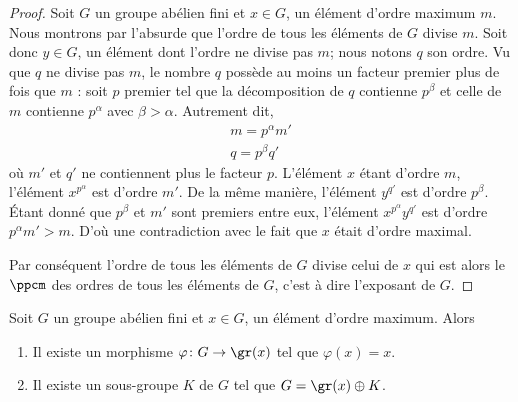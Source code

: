 \begin{proof}
    Soit \( G\) un groupe abélien fini et \( x\in G\), un élément d'ordre maximum \( m\). Nous montrons par l'absurde que l'ordre de tous les éléments de \( G\) divise \( m\). Soit donc \( y\in G\), un élément dont l'ordre ne divise pas \( m\); nous notons $q$ son ordre. Vu que \( q\) ne divise pas \( m\), le nombre \( q\) possède au moins un facteur premier plus de fois que \( m\) : soit \( p\) premier tel que la décomposition de \( q\) contienne \( p^{\beta}\) et celle de \( m\) contienne \( p^{\alpha}\) avec \( \beta>\alpha\). Autrement dit,
    \begin{subequations}
        \begin{align}
            m=p^{\alpha}m'\\
            q=p^{\beta}q'
        \end{align}
    \end{subequations}
    où \( m'\) et \( q'\) ne contiennent plus le facteur \( p\). L'élément \( x\) étant d'ordre \( m\), l'élément \( x^{p^{\alpha}}\) est d'ordre \( m'\). De la même manière, l'élément \( y^{q'}\) est d'ordre \( p^{\beta}\). Étant donné que \( p^{\beta}\) et \( m'\) sont premiers entre eux, l'élément  \( x^{p^{\alpha}}y^{q'}\) est d'ordre \( p^{\alpha}m'>m\). D'où une contradiction avec le fait que \( x\) était d'ordre maximal.

    Par conséquent l'ordre de tous les éléments de $G$ divise celui de \( x\) qui est alors le \( \ppcm\) des ordres de tous les éléments de \( G\), c'est à dire l'exposant de \( G\).
\end{proof}

\begin{proposition} \label{PropfPRVxi}
    Soit \( G\) un groupe abélien fini et \( x\in G\), un élément d'ordre maximum. Alors
    \begin{enumerate}
        \item
            Il existe un morphisme \( \varphi\colon G\to \gr(x)\) tel que \( \varphi(x)=x\).
        \item   \label{ItemKRYwjU}
            Il existe un sous-groupe \( K\) de \( G\) tel que \( G=\gr(x)\oplus K\).
    \end{enumerate}
\end{proposition}

